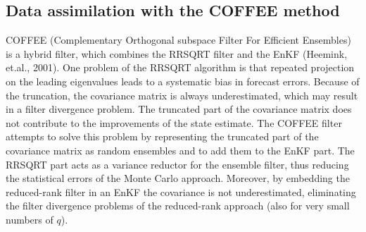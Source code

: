 \documentclass[a4paper,12pt]{article}
\begin{document}
\subsection{Data assimilation  with the COFFEE method}

       COFFEE (Complementary Orthogonal subspace Filter For Efficient
       Ensembles) is a hybrid filter, which combines the RRSQRT filter and the
       EnKF (Heemink, et.al., 2001). One problem of the RRSQRT algorithm is
       that repeated projection on the leading eigenvalues leads to a
       systematic bias in forecast errors. Because of the truncation, the
       covariance matrix is always underestimated, which may result in a filter
       divergence problem. The truncated part of the covariance matrix does not
       contribute to the improvements of the state estimate. The COFFEE filter
       attempts to solve this problem by representing the truncated part of the
       covariance matrix as random ensembles and to add them to the EnKF part.
       The RRSQRT part acts as a variance reductor for the ensemble filter,
       thus reducing the statistical errors of the Monte Carlo approach.
       Moreover, by embedding the reduced-rank filter in an EnKF the covariance
       is not underestimated, eliminating the filter divergence problems of the
       reduced-rank approach (also for very small numbers of $q$).
\end{document}
